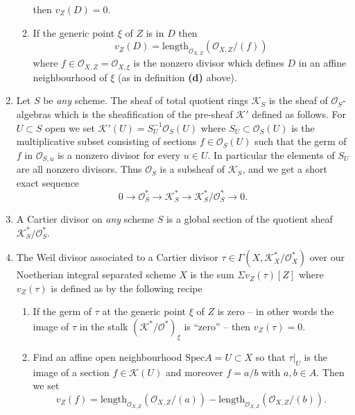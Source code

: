 \begin{definition}
\begin{enumerate}
\begin{enumerate}
then $v_Z(D)=0$.
\item If the generic point $\xi$ of $Z$ is in $D$
then 
$$
v_Z(D)=\text{length}_{{\mathcal O}_{X,Z}}({\mathcal O}_{X,Z}/(f))
$$
where $f \in {\mathcal O}_{X,Z}={\mathcal O}_{X,\xi}$ is the nonzero divisor
which defines $D$ in an affine neighbourhood of $\xi$ (as in definition
{\bf (d)} above).
\end{enumerate}
\item Let $S$ be {\it any} scheme. The sheaf of total quotient
rings ${\mathcal K}_S$ is the sheaf of ${\mathcal O}_S$-algebras which is
the sheafification of the pre-sheaf ${\mathcal K}'$ defined as follows.
For $U \subset S$ open we set ${\mathcal K}'(U) = S_U^{-1}{\mathcal O}_S(U)$
where $S_U \subset {\mathcal O}_S(U)$ is the multiplicative subset
consisting of sections $f \in {\mathcal O}_S(U)$ such that the germ
of $f$ in ${\mathcal O}_{S,u}$ is a nonzero divisor for every $u\in U$.
In particular the elements of $S_U$ are all nonzero divisors.
Thus ${\mathcal O}_S$ is a subsheaf of ${\mathcal K}_S$, and we get a
short exact sequence
$$
0 \to {\mathcal O}_S^\ast \to {\mathcal K}_S^\ast \to
{\mathcal K}_S^\ast/{\mathcal O}_S^\ast \to 0.
$$
\item A Cartier divisor on {\it any} scheme $S$ is a global
section of the quotient sheaf ${\mathcal K}_S^\ast/{\mathcal O}_S^\ast$.
\item The Weil divisor associated to a Cartier divisor
$\tau \in \Gamma(X, {\mathcal K}_X^\ast/{\mathcal O}_X^\ast)$ over our 
Noetherian integral separated scheme
$X$ is the sum $\Sigma v_Z(\tau)[Z]$ where $v_Z(\tau)$ is defined
as by the following recipe
\begin{enumerate}
\item If the germ of $\tau$ at the generic point $\xi$
of $Z$ is zero -- in other words the image of $\tau$ in the stalk
$({\mathcal K}^\ast/{\mathcal O}^\ast)_\xi$ is ``zero'' -- then $v_Z(\tau)=0$.
\item Find an affine open neighbourhood $\text{Spec} A = U \subset X$
so that $\tau|_U$ is the image of a section $f \in {\mathcal K}(U)$
and moreover $f = a/b$ with $a,b \in A$. Then we set
$$
v_Z(f)=\text{length}_{{\mathcal O}_{X,Z}}({\mathcal O}_{X,Z}/(a)) -
\text{length}_{{\mathcal O}_{X,Z}}({\mathcal O}_{X,Z}/(b)).
$$
\end{enumerate}
\end{enumerate}
\end{definition}

